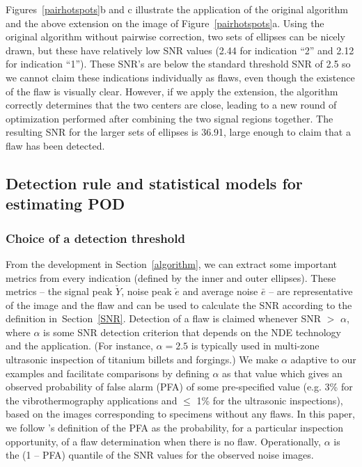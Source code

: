 \documentclass[12pt]{article}
\begin{document}
Figures~\ref{pairhotspots}b and c illustrate the application of the original  
algorithm and the above  extension on the image of
Figure~\ref{pairhotspots}a.   Using the original algorithm without 
pairwise correction, two sets of ellipses can be nicely drawn, but
these have relatively low SNR values (2.44 for indication ``2''  and 2.12
for indication ``1''). These SNR's are below the standard
threshold SNR  of 2.5 so we cannot claim these indications
individually as flaws, even though the existence of the flaw is 
visually clear. However, if we apply the 
extension, the algorithm correctly  determines that the two centers
are close, leading to a new round of optimization performed after
combining the two signal regions together. The resulting SNR for the
larger sets of ellipses is 36.91, large enough to claim that a flaw
has been detected.   
\subsection{Detection rule and statistical models for estimating POD}
\label{detection}
\subsubsection{Choice of a detection threshold}
\label{choice}
From the development in Section~\ref{algorithm}, we can
extract some important metrics from every indication (defined by the
inner and outer ellipses). These metrics -- the signal peak $\check Y$, 
noise peak $\check e$ and average noise $\bar e$ -- are  
representative of the image and the flaw and can be used to
calculate the SNR according to the definition in~Section~\ref{SNR}.  
Detection of a flaw is claimed whenever SNR $>$ $\alpha $, where
$\alpha $ is some SNR detection criterion that depends on the NDE
technology and the application. (For instance, $\alpha=2.5$ is
typically used in multi-zone ultrasonic inspection of titanium billets
and forgings.)  We make $\alpha $ adaptive to  our examples and 
facilitate comparisons by defining $\alpha $ as that 
value which gives an observed probability of false alarm (PFA) of some
pre-specified value (e.g. 3\% for the vibrothermography applications  
and $\le $ 1\% for the ultrasonic inspections), based on the images
corresponding  to specimens without any flaws. In this paper, we
follow \citet{olinandmeeker96}'s definition of the PFA as the
probability, for a particular inspection opportunity, of a flaw
determination when there is no flaw. Operationally, $\alpha $ is the
(1 -- PFA) quantile  of the SNR values for the observed noise images. 
\end{document}
